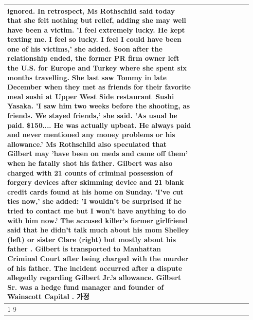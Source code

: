 \begin{table}[H]
\begin{tabular}{lllrlllll}
ignored. In retrospect, Ms Rothschild said today that she felt nothing but relief, adding she may well have been a victim. 'I feel extremely lucky. He kept texting me. I feel so lucky. I feel I could have been one of his victims,' she added. Soon after the relationship ended, the former PR firm owner left the U.S. for Europe and Turkey where she spent six months  travelling. She last saw Tommy in late December when they met as friends for their favorite meal sushi at Upper West Side restaurant Sushi Yasaka. 'I saw him two weeks before the shooting, as friends. We stayed friends,' she said. 'As usual he paid. \$150.... He was actually upbeat. He always paid and never mentioned any money problems or his allowance.' Ms Rothschild also speculated that Gilbert may 'have been on meds and came off them' when he fatally shot his father. Gilbert was also charged with 21 counts of criminal possession of forgery devices after skimming device and 21 blank credit cards found at his home on Sunday. 'I've cut ties now,' she added: 'I wouldn’t be surprised if he tried to contact me but I won’t have anything to do with him now.' The accused killer's former girlfriend said that he didn't talk much about his mom Shelley (left) or sister Clare (right) but mostly about his father . Gilbert is transported to Manhattan Criminal Court  after being charged with the murder of his father. The incident occurred after a dispute allegedly regarding Gilbert Jr.'s allowance. Gilbert Sr. was a hedge fund manager and founder of Wainscott Capital . 가정 \\
\cline{1-9}

\end{tabular}
\end{table}
